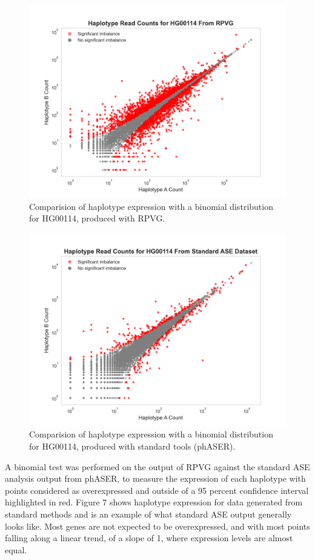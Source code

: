 \documentclass{article}
\begin{document}
\begin{figure}[H]
  \centering
  \includegraphics[width=0.8\linewidth]{HG00114_RPVG.png}
  \caption{Comparision of haplotype expression with a binomial distribution for 
  HG00114, produced with RPVG.}
\end{figure}  

\begin{figure}[H]
  \centering
  \includegraphics[width=0.8\linewidth]{HG00114_Standard.png}
  \caption{Comparision of haplotype expression with a binomial distribution for 
  HG00114, produced with standard tools (phASER).}
\end{figure}  

A binomial test was performed on the output of RPVG against the standard ASE analysis output from phASER, 
to measure the expression of each haplotype
with points considered as overexpressed and outside of a 95 percent confidence interval highlighted 
in red. Figure 7 shows haplotype expression for data generated from standard methods and is an example
of what standard ASE output generally looks like. Most genes are not expected to be overexpressed, and 
with most points falling along a linear trend, of a slope of 1, where expression levels are almost equal. 
\end{document}
